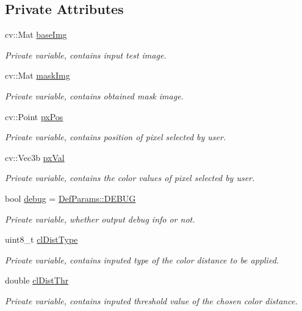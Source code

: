 \subsection*{Private Attributes}
\begin{DoxyCompactItemize}
\item 
cv\+::\+Mat \mbox{\hyperlink{class_converter_a18f46c46afdfdbca3164cfe21b7f396d}{base\+Img}}
\begin{DoxyCompactList}\small\item\em Private variable, contains input test image. \end{DoxyCompactList}\item 
cv\+::\+Mat \mbox{\hyperlink{class_converter_a242e40c925fedcc92959bc76d24c77d5}{mask\+Img}}
\begin{DoxyCompactList}\small\item\em Private variable, contains obtained mask image. \end{DoxyCompactList}\item 
cv\+::\+Point \mbox{\hyperlink{class_converter_af5ef027f6fd12d21306f669275664497}{px\+Pos}}
\begin{DoxyCompactList}\small\item\em Private variable, contains position of pixel selected by user. \end{DoxyCompactList}\item 
cv\+::\+Vec3b \mbox{\hyperlink{class_converter_acf7b32e1932bc6c2bbbe7397c9f3e5c1}{px\+Val}}
\begin{DoxyCompactList}\small\item\em Private variable, contains the color values of pixel selected by user. \end{DoxyCompactList}\item 
bool \mbox{\hyperlink{class_converter_a74f8e7af0fc2b296e50d29d0cc5f3651}{debug}} = \mbox{\hyperlink{namespace_def_params_a7e97783bd3e1a571a7f6c2297cbcd17c}{Def\+Params\+::\+D\+E\+B\+UG}}
\begin{DoxyCompactList}\small\item\em Private variable, whether output debug info or not. \end{DoxyCompactList}\item 
uint8\+\_\+t \mbox{\hyperlink{class_converter_a5d6037707465f267e1588735244be710}{cl\+Dist\+Type}}
\begin{DoxyCompactList}\small\item\em Private variable, contains inputed type of the color distance to be applied. \end{DoxyCompactList}\item 
double \mbox{\hyperlink{class_converter_a1e0bff93aec2544cdecfb00db1006d0d}{cl\+Dist\+Thr}}
\begin{DoxyCompactList}\small\item\em Private variable, contains inputed threshold value of the chosen color distance. \end{DoxyCompactList}\end{DoxyCompactItemize}


